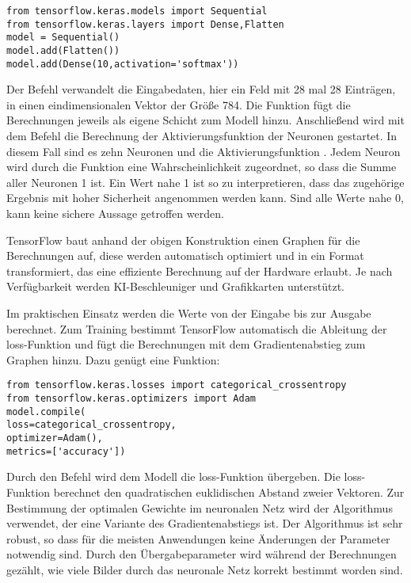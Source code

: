 \medskip

\begin{verbatim}
from tensorflow.keras.models import Sequential
from tensorflow.keras.layers import Dense,Flatten
model = Sequential()
model.add(Flatten())
model.add(Dense(10,activation='softmax'))
\end{verbatim}

\medskip

Der Befehl  verwandelt die Eingabedaten,
hier ein Feld mit 28 mal 28 Einträgen, in einen eindimensionalen 
Vektor der Größe 784. Die Funktion  fügt die
Berechnungen jeweils als eigene Schicht zum Modell hinzu.
Anschließend wird mit dem Befehl  die 
Berechnung der Aktivierungsfunktion der Neuronen gestartet. 
In diesem Fall sind es zehn Neuronen und die Aktivierungsfunktion 
.
Jedem Neuron wird durch die Funktion   eine Wahrscheinlichkeit zugeordnet,
so dass die Summe aller Neuronen 1 ist. Ein Wert nahe 1 ist so zu interpretieren, dass das zugehörige Ergebnis mit hoher Sicherheit
angenommen werden kann. Sind alle Werte nahe 0, kann keine sichere Aussage getroffen werden.


TensorFlow baut anhand der obigen Konstruktion einen Graphen für die Berechnungen 
auf, diese werden automatisch optimiert und in ein Format transformiert, das eine effiziente Berechnung
auf der Hardware erlaubt. Je nach Verfügbarkeit werden
KI-Beschleuniger und Grafikkarten unterstützt.

Im praktischen Einsatz werden die Werte von der Eingabe bis zur Ausgabe berechnet.
Zum Training bestimmt TensorFlow automatisch die Ableitung der
loss-Funktion und fügt die Berechnungen mit dem Gradientenabstieg zum Graphen hinzu.
Dazu genügt eine Funktion:

\begin{verbatim}
from tensorflow.keras.losses import categorical_crossentropy
from tensorflow.keras.optimizers import Adam
model.compile(
loss=categorical_crossentropy,
optimizer=Adam(),
metrics=['accuracy'])
\end{verbatim}

Durch den Befehl wird dem Modell die loss-Funktion 
übergeben. Die loss-Funktion berechnet den quadratischen euklidischen Abstand zweier Vektoren.
Zur Bestimmung der optimalen Gewichte im neuronalen Netz wird der Algorithmus 
verwendet, der eine  Variante des Gradientenabstiegs ist. Der Algorithmus ist sehr robust, so dass 
für die meisten Anwendungen keine Änderungen der Parameter notwendig sind.
Durch den Übergabeparameter  wird während der Berechnungen  
gezählt, wie viele Bilder durch das neuronale Netz korrekt bestimmt worden sind.



